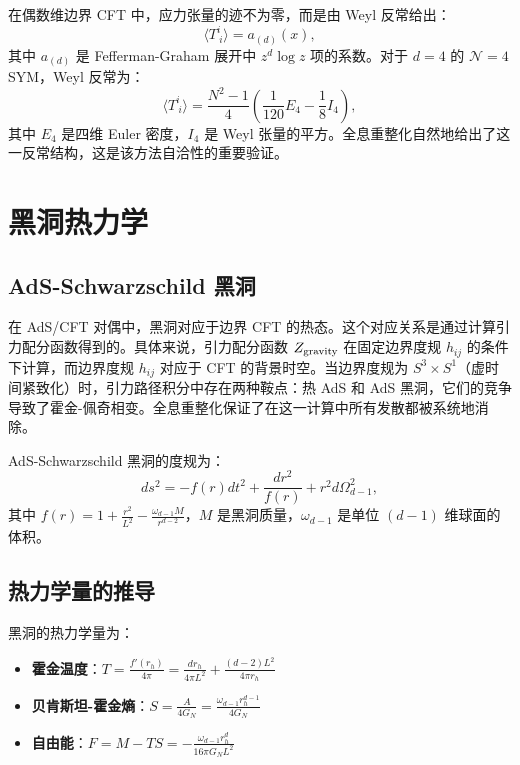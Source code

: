 \begin{note}
在偶数维边界 CFT 中，应力张量的迹不为零，而是由 Weyl 反常给出\cite{Henningson1998}：
\begin{equation}
    \langle T^i_{\ i} \rangle = a_{(d)}(x),
\end{equation}
其中 $a_{(d)}$ 是 Fefferman-Graham 展开中 $z^d \log z$ 项的系数。对于 $d=4$ 的 $\mathcal{N}=4$ SYM，Weyl 反常为：
\begin{equation}
    \langle T^i_{\ i} \rangle = \frac{N^2 - 1}{4} \left( \frac{1}{120} E_4 - \frac{1}{8} I_4 \right),
\end{equation}
其中 $E_4$ 是四维 Euler 密度，$I_4$ 是 Weyl 张量的平方。全息重整化自然地给出了这一反常结构，这是该方法自洽性的重要验证\cite{Skenderis2002}。
\end{note}

\section{黑洞热力学}

\subsection{AdS-Schwarzschild 黑洞}

在 AdS/CFT 对偶中，黑洞对应于边界 CFT 的热态。这个对应关系是通过计算引力配分函数得到的。具体来说，引力配分函数 $Z_{\rm gravity}$ 在固定边界度规 $h_{ij}$ 的条件下计算，而边界度规 $h_{ij}$ 对应于 CFT 的背景时空。当边界度规为 $S^3 \times S^1$（虚时间紧致化）时，引力路径积分中存在两种鞍点：热 AdS 和 AdS 黑洞，它们的竞争导致了霍金-佩奇相变\cite{Hawking1983}。全息重整化\cite{Skenderis2002}保证了在这一计算中所有发散都被系统地消除。

\begin{definition}
AdS-Schwarzschild 黑洞的度规为：
\begin{equation}
    ds^2 = -f(r) dt^2 + \frac{dr^2}{f(r)} + r^2 d\Omega_{d-1}^2,
\end{equation}
其中 $f(r) = 1 + \frac{r^2}{L^2} - \frac{\omega_{d-1} M}{r^{d-2}}$，$M$ 是黑洞质量，$\omega_{d-1}$ 是单位 $(d-1)$ 维球面的体积。
\end{definition}

\subsection{热力学量的推导}

\begin{property}[黑洞的热力学量]
黑洞的热力学量为：
\begin{itemize}
    \item \textbf{霍金温度}：$T = \frac{f'(r_h)}{4\pi} = \frac{d r_h}{4\pi L^2} + \frac{(d-2) L^2}{4\pi r_h}$
    \item \textbf{贝肯斯坦-霍金熵}：$S = \frac{A}{4G_N} = \frac{\omega_{d-1} r_h^{d-1}}{4G_N}$
    \item \textbf{自由能}：$F = M - TS = -\frac{\omega_{d-1} r_h^d}{16\pi G_N L^2}$
\end{itemize}
\end{property}

